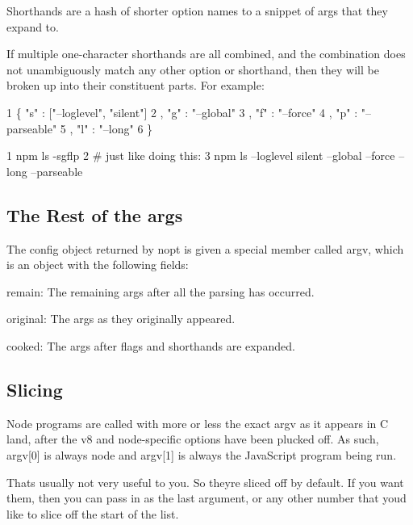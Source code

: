 Shorthands are a hash of shorter option names to a snippet of args that they expand to.

If multiple one-\/character shorthands are all combined, and the combination does not unambiguously match any other option or shorthand, then they will be broken up into their constituent parts. For example\+:


\begin{DoxyCode}
1 \{ "s" : ["--loglevel", "silent"]
2 , "g" : "--global"
3 , "f" : "--force"
4 , "p" : "--parseable"
5 , "l" : "--long"
6 \}
\end{DoxyCode}



\begin{DoxyCode}
1 npm ls -sgflp
2 # just like doing this:
3 npm ls --loglevel silent --global --force --long --parseable
\end{DoxyCode}


\subsection*{The Rest of the args}

The config object returned by nopt is given a special member called {\ttfamily argv}, which is an object with the following fields\+:


\begin{DoxyItemize}
\item {\ttfamily remain}\+: The remaining args after all the parsing has occurred.
\item {\ttfamily original}\+: The args as they originally appeared.
\item {\ttfamily cooked}\+: The args after flags and shorthands are expanded.
\end{DoxyItemize}

\subsection*{Slicing}

Node programs are called with more or less the exact argv as it appears in C land, after the v8 and node-\/specific options have been plucked off. As such, {\ttfamily argv\mbox{[}0\mbox{]}} is always {\ttfamily node} and {\ttfamily argv\mbox{[}1\mbox{]}} is always the Java\+Script program being run.

That\textquotesingle{}s usually not very useful to you. So they\textquotesingle{}re sliced off by default. If you want them, then you can pass in {} as the last argument, or any other number that you\textquotesingle{}d like to slice off the start of the list. 